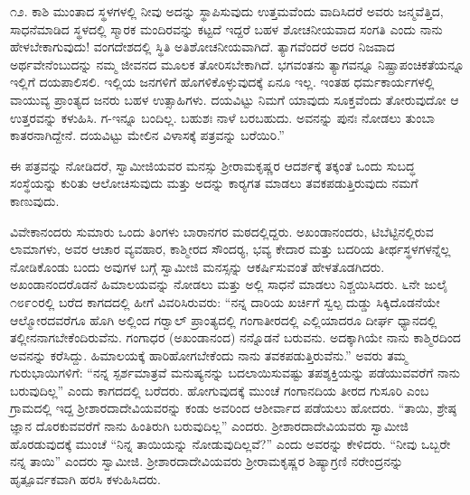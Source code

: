  ೧೨. ಕಾಶಿ ಮುಂತಾದ ಸ್ಥಳಗಳಲ್ಲಿ ನೀವು ಅದನ್ನು ಸ್ಥಾಪಿಸುವುದು ಉತ್ತಮವೆಂದು ವಾದಿಸಿದರೆ ಅವರು ಜನ್ಮವೆತ್ತಿದ, ಸಾಧನೆಮಾಡಿದ ಸ್ಥಳದಲ್ಲಿ ಸ್ಮಾರಕ ಮಂದಿರವನ್ನು ಕಟ್ಟದೆ ಇದ್ದರೆ ಬಹಳ ಶೋಚನೀಯವಾದ ಸಂಗತಿ ಎಂದು ನಾನು ಹೇಳಬೇಕಾಗುವುದು! ವಂಗದೇಶದಲ್ಲಿ ಸ್ಥಿತಿ ಅತಿಶೋಚನೀಯವಾಗಿದೆ. ತ್ಯಾಗವೆಂದರೆ ಅದರ ನಿಜವಾದ ಅರ್ಥವೇನೆಂಬುದನ್ನು ನಮ್ಮ ಜೀವನದ ಮೂಲಕ ತೋರಿಸಬೇಕಾಗಿದೆ. ಭಗವಂತನು ತ್ಯಾಗವನ್ನೂ ನಿಷ್ಪ್ರಾಪಂಚಿಕತೆಯನ್ನೂ ಇಲ್ಲಿಗೆ ದಯಪಾಲಿಸಲಿ. ಇಲ್ಲಿಯ ಜನಗಳಿಗೆ ಹೊಗಳಿಕೊಳ್ಳುವುದಕ್ಕೆ ಏನೂ ಇಲ್ಲ. ಇಂತಹ ಧರ್ಮಕಾರ್ಯಗಳಲ್ಲಿ ವಾಯುವ್ಯ ಪ್ರಾಂತ್ಯದ ಜನರು ಬಹಳ ಉತ್ಸಾಹಿಗಳು. ದಯವಿಟ್ಟು ನಿಮಗೆ ಯಾವುದು ಸೂಕ್ತವೆಂದು ತೋರುವುದೋ ಆ ಉತ್ತರವನ್ನು ಕಳುಹಿಸಿ. ಗ-ಇನ್ನೂ ಬಂದಿಲ್ಲ. ಬಹುಶಃ ನಾಳೆ ಬರಬಹುದು. ಅವನನ್ನು ಪುನಃ ನೋಡಲು ತುಂಬಾ ಕಾತರನಾಗಿದ್ದೇನೆ. ದಯವಿಟ್ಟು ಮೇಲಿನ ವಿಳಾಸಕ್ಕೆ ಪತ್ರವನ್ನು ಬರೆಯಿರಿ.” 

 ಈ ಪತ್ರವನ್ನು ನೋಡಿದರೆ, ಸ್ವಾಮೀಜಿಯವರ ಮನಸ್ಸು ಶ‍್ರೀರಾಮಕೃಷ್ಣರ ಆದರ್ಶಕ್ಕೆ ತಕ್ಕಂತೆ ಒಂದು ಸುಬದ್ಧ ಸಂಸ್ಥೆಯನ್ನು ಕುರಿತು ಆಲೋಚಿಸುವುದು ಮತ್ತು ಅದನ್ನು ಕಾರ‍್ಯಗತ ಮಾಡಲು ತವಕಪಡುತ್ತಿರುವುದು ನಮಗೆ ಕಾಣುವುದು. 

 ವಿವೇಕಾನಂದರು ಸುಮಾರು ಒಂದು ತಿಂಗಳು ಬಾರಾನಗರ ಮಠದಲ್ಲಿದ್ದರು. ಅಖಂಡಾನಂದರು, ಟಿಬೆಟ್ಟಿನಲ್ಲಿರುವ ಲಾಮಾಗಳು, ಅವರ ಆಚಾರ ವ್ಯವಹಾರ, ಕಾಶ್ಮೀರದ ಸೌಂದರ‍್ಯ, ಭವ್ಯ ಕೇದಾರ ಮತ್ತು ಬದರಿಯ ತೀರ್ಥಸ್ಥಳಗಳನ್ನೆಲ್ಲ ನೋಡಿಕೊಂಡು ಬಂದು ಅವುಗಳ ಬಗ್ಗೆ ಸ್ವಾಮೀಜಿ ಮನಸ್ಸನ್ನು ಆಕರ್ಷಿಸುವಂತೆ ಹೇಳತೊಡಗಿದರು. ಅಖಂಡಾನಂದರೊಡನೆ ಹಿಮಾಲಯವನ್ನು ನೋಡಲು ಮತ್ತು ಅಲ್ಲಿ ಸಾಧನೆ ಮಾಡಲು ನಿಶ್ಚಯಿಸಿದರು. ೬ನೇ ಜುಲೈ ೧೮೯೦ರಲ್ಲಿ ಬರೆದ ಕಾಗದದಲ್ಲಿ ಹೀಗೆ ವಿವರಿಸಿರುವರು: “ನನ್ನ ದಾರಿಯ ಖರ್ಚಿಗೆ ಸ್ವಲ್ಪ ದುಡ್ಡು ಸಿಕ್ಕಿದೊಡನೆಯೇ ಆಲ್ಮೋರದವರೆಗೂ ಹೊಗಿ ಅಲ್ಲಿಂದ ಗರ‍್ವಾಲ್ ಪ್ರಾಂತ್ಯದಲ್ಲಿ ಗಂಗಾತೀರದಲ್ಲಿ ಎಲ್ಲಿಯಾದರೂ ದೀರ್ಘ ಧ್ಯಾನದಲ್ಲಿ ತಲ್ಲೀನನಾಗಬೇಕೆಂದಿರುವೆನು. ಗಂಗಾಧರ (ಅಖಂಡಾನಂದ) ನನ್ನೊಡನೆ ಬರುವನು. ಅದಕ್ಕಾಗಿಯೇ ನಾನು ಕಾಶ್ಮಿರದಿಂದ ಅವನನ್ನು ಕರೆಸಿದ್ದು. ಹಿಮಾಲಯಕ್ಕೆ ಹಾರಿಹೋಗಬೇಕೆಂದು ನಾನು ತವಕಪಡುತ್ತಿರುವೆನು.” ಅವರು ತಮ್ಮ ಗುರುಭಾಯಿಗಳಿಗೆ: “ನನ್ನ ಸ್ಪರ್ಶಮಾತ್ರವೆ ಮನುಷ್ಯನನ್ನು ಬದಲಾಯಿಸುವಷ್ಟು ತಪಶ್ಶಕ್ತಿಯನ್ನು ಪಡೆಯುವವರೆಗೆ ನಾನು ಬರುವುದಿಲ್ಲ” ಎಂದು ಕಾಗದದಲ್ಲಿ ಬರೆದರು. ಹೋಗುವುದಕ್ಕೆ ಮುಂಚೆ ಗಂಗಾನದಿಯ ತೀರದ ಗುಸೂರಿ ಎಂಬ ಗ್ರಾಮದಲ್ಲಿ ಇದ್ದ ಶ‍್ರೀಶಾರದಾದೇವಿಯವರನ್ನು ಕಂಡು ಅವರಿಂದ ಆಶೀರ್ವಾದ ಪಡೆಯಲು ಹೋದರು. “ತಾಯಿ, ಶ್ರೇಷ್ಠ ಜ್ಞಾನ ದೊರಕುವವರೆಗೆ ನಾನು ಹಿಂತಿರುಗಿ ಬರುವುದಿಲ್ಲ” ಎಂದರು. ಶ‍್ರೀಶಾರದಾದೇವಿಯವರು ಸ್ವಾಮೀಜಿ ಹೊರಡುವುದಕ್ಕೆ ಮುಂಚೆ “ನಿನ್ನ ತಾಯಿಯನ್ನು ನೋಡುವುದಿಲ್ಲವೆ?” ಎಂದು ಅವರನ್ನು ಕೇಳಿದರು. “ನೀವು ಒಬ್ಬರೇ ನನ್ನ ತಾಯಿ” ಎಂದರು ಸ್ವಾಮೀಜಿ. ಶ‍್ರೀಶಾರದಾದೇವಿಯವರು ಶ‍್ರೀರಾಮಕೃಷ್ಣರ ಶಿಷ್ಯಾಗ್ರಣಿ ನರೇಂದ್ರನನ್ನು ಹೃತ್ಪೂರ್ವಕವಾಗಿ ಹರಸಿ ಕಳುಹಿಸಿದರು.

